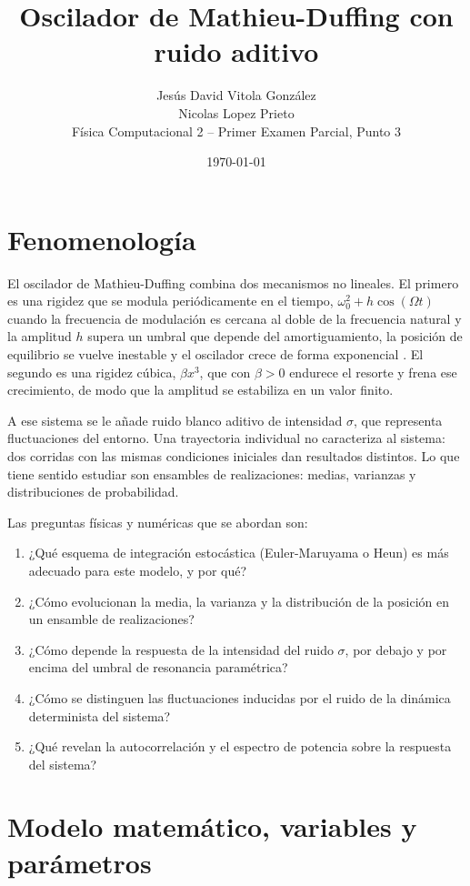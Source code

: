 \documentclass[12pt,a4paper]{article}
\title{\textbf{Oscilador de Mathieu-Duffing con ruido aditivo}}
\author{Jesús David Vitola González\\ Nicolas Lopez Prieto \\ [2pt] Física Computacional 2 -- Primer Examen Parcial, Punto 3}
\date{\today}
\begin{document}
\maketitle

\section{Fenomenología}

El oscilador de Mathieu-Duffing combina dos mecanismos no lineales. El primero es una rigidez que se modula periódicamente en el tiempo, $\omega_0^2+h\cos(\Omega t)$ cuando la frecuencia de modulación es cercana al doble de la frecuencia natural y la amplitud $h$ supera un umbral que depende del amortiguamiento, la posición de equilibrio se vuelve inestable y el oscilador crece de forma exponencial \cite{landau1976,nayfeh1979}. El segundo es una rigidez cúbica, $\beta x^{3}$, que con $\beta>0$ endurece el resorte y frena ese crecimiento, de modo que la amplitud se estabiliza en un valor finito.

A ese sistema se le añade ruido blanco aditivo de intensidad $\sigma$, que representa fluctuaciones del entorno. Una trayectoria individual no caracteriza al sistema: dos corridas con las mismas condiciones iniciales dan resultados distintos. Lo que tiene sentido estudiar son ensambles de realizaciones: medias, varianzas y distribuciones de probabilidad.

Las preguntas físicas y numéricas que se abordan son:
\begin{enumerate}[label=\textbf{\arabic*.}]
    \item ¿Qué esquema de integración estocástica (Euler-Maruyama o Heun) es más adecuado para este modelo, y por qué?
    \item ¿Cómo evolucionan la media, la varianza y la distribución de la posición en un ensamble de realizaciones?
    \item ¿Cómo depende la respuesta de la intensidad del ruido $\sigma$, por debajo y por encima del umbral de resonancia paramétrica?
    \item ¿Cómo se distinguen las fluctuaciones inducidas por el ruido de la dinámica determinista del sistema?
    \item ¿Qué revelan la autocorrelación y el espectro de potencia sobre la respuesta del sistema?
\end{enumerate}

\section{Modelo matemático, variables y parámetros}
\end{document}
